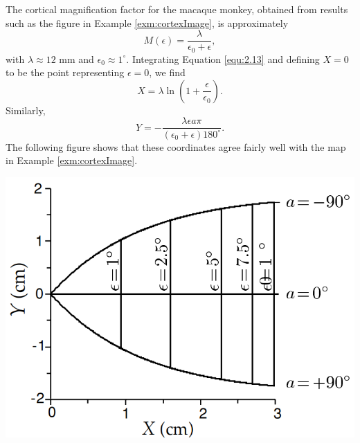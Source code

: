 \begin{exm}
  \label{exm:macaqueMonkey}
  The cortical magnification factor for the macaque monkey, obtained from results such as the figure in Example \ref{exm:cortexImage}, is approximately
  \begin{equation}
    \label{equ:2.14}
    M(\epsilon) = \frac{\lambda}{\epsilon_0+\epsilon},
  \end{equation}
  with $\lambda \approx 12$ mm and $\epsilon_0 \approx 1^{\circ}$. Integrating Equation \ref{equ:2.13} and defining $X = 0$ to be the point representing $\epsilon = 0$, we find
  \begin{equation}
    \label{equ:2.15}
    X = \lambda \ln(1+\frac{\epsilon}{\epsilon_0}).
  \end{equation}
  Similarly,
  \begin{equation}
    \label{equ:2.17}
    Y = -\frac{\lambda\epsilon a \pi}{(\epsilon_0+\epsilon)180^{\circ}}.
  \end{equation}
  The following figure shows that these coordinates agree fairly well with the map in Example \ref{exm:cortexImage}.
  \begin{center}
    \includegraphics[scale=0.2]{./png/exm_retinotopicMap}
  \end{center}
\end{exm}

